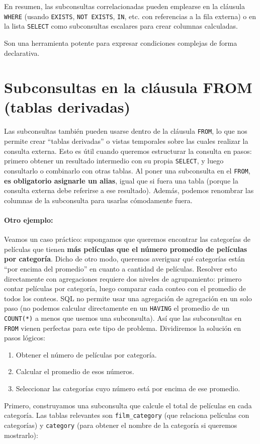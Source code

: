 \documentclass[12pt,a4paper]{article}
\begin{document}
En resumen, las subconsultas correlacionadas pueden emplearse en la cláusula \texttt{WHERE} (usando \texttt{EXISTS}, \texttt{NOT EXISTS}, \texttt{IN}, etc.
%
con referencias a la fila externa) o en la lista \texttt{SELECT} como subconsultas escalares para crear columnas calculadas.


Son una herramienta potente para expresar condiciones complejas de forma declarativa. \section{Subconsultas en la cláusula FROM (tablas derivadas)} Las subconsultas también pueden usarse dentro de la cláusula \texttt{FROM}, lo que nos permite crear “tablas derivadas” o vistas temporales sobre las cuales realizar la consulta externa.
%
Esto es útil cuando queremos estructurar la consulta en pasos: primero obtener un resultado intermedio con su propia \texttt{SELECT}, y luego consultarlo o combinarlo con otras tablas.
%
Al poner una subconsulta en el \texttt{FROM}, \textbf{es obligatorio asignarle un alias}, igual que si fuera una tabla (porque la consulta externa debe referirse a ese resultado).
%
Además, podemos renombrar las columnas de la subconsulta para usarlas cómodamente fuera.

\paragraph{Otro ejemplo:}
Veamos un caso práctico: supongamos que queremos encontrar las categorías de películas que tienen \textbf{más películas que el número promedio de películas por categoría}.
%
Dicho de otro modo, queremos averiguar qué categorías están “por encima del promedio” en cuanto a cantidad de películas.
%
Resolver esto directamente con agregaciones requiere dos niveles de agrupamiento: primero contar películas por categoría, luego comparar cada conteo con el promedio de todos los conteos.
%
SQL no permite usar una agregación de agregación en un solo paso (no podemos calcular directamente en un \texttt{HAVING} el promedio de un \texttt{COUNT(*)} a menos que usemos una subconsulta).
%
Así que las subconsultas en \texttt{FROM} vienen perfectas para este tipo de problema.
%
Dividiremos la solución en pasos lógicos: 


\begin{enumerate}
\item Obtener el número de películas por categoría.
\item Calcular el promedio de esos números.
\item Seleccionar las categorías cuyo número está por encima de ese promedio.
\end{enumerate} Primero, construyamos una subconsulta que calcule el total de películas en cada categoría.
%
Las tablas relevantes son \texttt{film\_category} (que relaciona películas con categorías) y \texttt{category} (para obtener el nombre de la categoría si queremos mostrarlo): 
\end{document}
